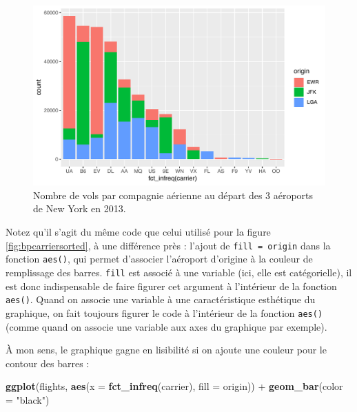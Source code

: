 \documentclass[
  a4paper,
]{article}
\newenvironment{Shaded}{\begin{snugshade}}{\end{snugshade}}
\newcommand{\DataTypeTok}[1]{\textcolor[rgb]{0.00,0.34,0.68}{#1}}
\newcommand{\KeywordTok}[1]{\textcolor[rgb]{0.12,0.11,0.11}{\textbf{#1}}}
\newcommand{\NormalTok}[1]{\textcolor[rgb]{0.12,0.11,0.11}{#1}}
\newcommand{\OperatorTok}[1]{\textcolor[rgb]{0.12,0.11,0.11}{#1}}
\newcommand{\StringTok}[1]{\textcolor[rgb]{0.75,0.01,0.01}{#1}}
\begin{document}
\begin{figure}[htpb]

{\centering \includegraphics[width=0.9\linewidth]{figure/stacked-1} 

}

\caption{Nombre de vols par compagnie aérienne au départ des 3 aéroports de New York en 2013.}\label{fig:stacked}
\end{figure}

Notez qu'il s'agit du même code que celui utilisé pour la figure \ref{fig:bpcarriersorted}, à une différence près : l'ajout de \texttt{fill\ =\ origin} dans la fonction \texttt{aes()}, qui permet d'associer l'aéroport d'origine à la couleur de remplissage des barres. \texttt{fill} est associé à une variable (ici, elle est catégorielle), il est donc indispensable de faire figurer cet argument à l'intérieur de la fonction \texttt{aes()}. Quand on associe une variable à une caractéristique esthétique du graphique, on fait toujours figurer le code à l'intérieur de la fonction \texttt{aes()} (comme quand on associe une variable aux axes du graphique par exemple).

À mon sens, le graphique gagne en lisibilité si on ajoute une couleur pour le contour des barres :

\begin{Shaded}
\begin{Highlighting}[]
\KeywordTok{ggplot}\NormalTok{(flights, }\KeywordTok{aes}\NormalTok{(}\DataTypeTok{x =} \KeywordTok{fct_infreq}\NormalTok{(carrier), }\DataTypeTok{fill =}\NormalTok{ origin)) }\OperatorTok{+}
\StringTok{  }\KeywordTok{geom_bar}\NormalTok{(}\DataTypeTok{color =} \StringTok{"black"}\NormalTok{)}
\end{Highlighting}
\end{Shaded}
\end{document}

